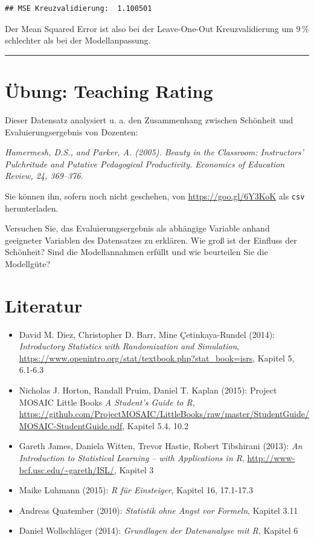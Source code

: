\documentclass[12pt,ngerman,paper=a4,pagesize,DIV=13]{scrreprt}
\providecommand{\tightlist}{%
  \setlength{\itemsep}{0pt}\setlength{\parskip}{0pt}}
\begin{document}
\begin{verbatim}
## MSE Kreuzvalidierung:  1.100501
\end{verbatim}

Der Mean Squared Error ist also bei der Leave-One-Out Kreuzvalidierung
um 9\(\,\)\% schlechter als bei der Modellanpassung.

\begin{center}\rule{0.5\linewidth}{\linethickness}\end{center}

\hypertarget{ubung-teaching-rating-3}{%
\section{Übung: Teaching Rating}\label{ubung-teaching-rating-3}}

Dieser Datensatz analysiert u. a. den Zusammenhang zwischen Schönheit
und Evaluierungsergebnis von Dozenten:

\emph{Hamermesh, D.S., and Parker, A. (2005). Beauty in the Classroom:
Instructors' Pulchritude and Putative Pedagogical Productivity.
Economics of Education Review, 24, 369--376.}

Sie können ihn, sofern noch nicht geschehen, von
\url{https://goo.gl/6Y3KoK} als \texttt{csv} herunterladen.

Versuchen Sie, das Evaluierungsergebnis als abhängige Variable anhand
geeigneter Variablen des Datensatzes zu erklären. Wie groß ist der
Einfluss der Schönheit? Sind die Modellannahmen erfüllt und wie
beurteilen Sie die Modellgüte?

\hypertarget{literatur-5}{%
\section{Literatur}\label{literatur-5}}

\begin{itemize}
\tightlist
\item
  David M. Diez, Christopher D. Barr, Mine Çetinkaya-Rundel (2014):
  \emph{Introductory Statistics with Randomization and Simulation},
  \url{https://www.openintro.org/stat/textbook.php?stat_book=isrs},
  Kapitel 5, 6.1-6.3
\item
  Nicholas J. Horton, Randall Pruim, Daniel T. Kaplan (2015): Project
  MOSAIC Little Books \emph{A Student's Guide to R},
  \url{https://github.com/ProjectMOSAIC/LittleBooks/raw/master/StudentGuide/MOSAIC-StudentGuide.pdf},
  Kapitel 5.4, 10.2
\item
  Gareth James, Daniela Witten, Trevor Hastie, Robert Tibshirani (2013):
  \emph{An Introduction to Statistical Learning -- with Applications in
  R}, \url{http://www-bcf.usc.edu/~gareth/ISL/}, Kapitel 3
\item
  Maike Luhmann (2015): \emph{R für Einsteiger}, Kapitel 16, 17.1-17.3
\item
  Andreas Quatember (2010): \emph{Statistik ohne Angst vor Formeln},
  Kapitel 3.11
\item
  Daniel Wollschläger (2014): \emph{Grundlagen der Datenanalyse mit R},
  Kapitel 6
\end{itemize}
\end{document}
